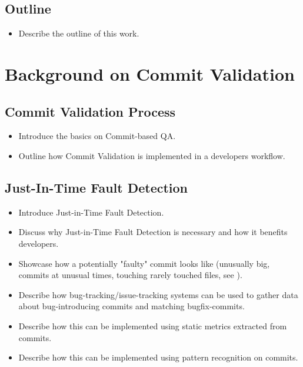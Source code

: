 \subsection{Outline}
\begin{itemize}
	\item Describe the outline of this work.
\end{itemize}


\section{Background on Commit Validation}

\subsection{Commit Validation Process}
\label{sec:cvprocess}
\begin{itemize}
	\item Introduce the basics on Commit-based QA.
	\item Outline how Commit Validation is implemented in a developers workflow.
\end{itemize}

\subsection{Just-In-Time Fault Detection}
\begin{itemize}
	\item Introduce Just-in-Time Fault Detection.
	\item Discuss why Just-in-Time Fault Detection is necessary and how it benefits developers.
	\item Showcase how a potentially "faulty" commit looks like (unusually big, commits at unusual times, touching rarely touched files, see \cite{Goyal2017}).
	\item Describe how bug-tracking/issue-tracking systems can be used to gather data about bug-introducing commits and matching bugfix-commits.
	\item Describe how this can be implemented using static metrics extracted from commits.
	\item Describe how this can be implemented using pattern recognition on commits.
\end{itemize}

